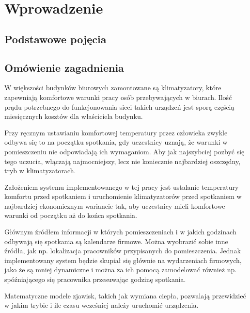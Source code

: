 \chapter{Wprowadzenie}
\section{Podstawowe pojęcia}




\section{Omówienie zagadnienia}
W większości budynków biurowych zamontowane są klimatyzatory, które zapewniają komfortowe warunki pracy osób przebywających w biurach. 
Ilość prądu potrzebnego do funkcjonowania sieci takich urządzeń jest sporą częścią miesięcznych kosztów dla właściciela budynku.

Przy ręcznym ustawianiu komfortowej temperatury przez człowieka zwykle odbywa się to na początku spotkania, gdy uczestnicy uznają, że warunki w pomieszczeniu nie odpowiadają ich wymaganiom. Aby jak najszybciej pozbyć się tego uczucia, włączają najmocniejszy, lecz nie koniecznie najbardziej oszczędny, tryb w klimatyzatorach.

Założeniem systemu implementowanego w tej pracy jest ustalanie temperatury komfortu przed spotkaniem i uruchomienie klimatyzatorów przed spotkaniem w najbardziej ekonomicznym wariancie tak, aby uczestnicy mieli komfortowe warunki od początku aż do końca spotkania. 

Głównym źródłem informacji w których pomieszczeniach i w jakich godzinach odbywają się spotkania są kalendarze firmowe. Można wyobrazić sobie inne źródła, jak np. lokalizacja pracowników przypisanych do pomieszczenia. Jednak implementowany system będzie skupiał się głównie na wydarzeniach firmowych, jako że są mniej dynamiczne i można za ich pomocą zamodelować również np. spóźniającego się pracownika przesuwając godzinę spotkania.

Matematyczne modele zjawisk, takich jak wymiana ciepła, pozwalają przewidzieć w jakim trybie i ile czasu wcześniej należy uruchomić urządzenia.
